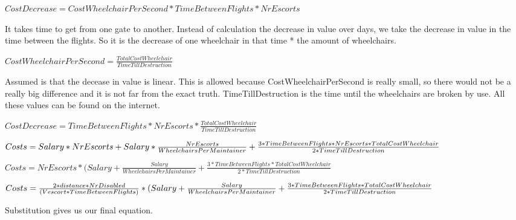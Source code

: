 \documentclass[a4paper, 11pt, notitlepage]{report}
\begin{document}
\begin{description}
	\item
	\item $CostDecrease  = CostWheelchairPerSecond * TimeBetweenFlights * NrEscorts$
	\item[Explanation:] It takes time to get from one gate to another. Instead of calculation the decrease in value over days, we take the decrease in value in the time between the flights. So it is the decrease of one wheelchair in that time * the amount of wheelchairs.
	\item $CostWheelchairPerSecond = \frac{TotalCostWheelchair}{TimeTillDestruction}$
	\item[Explanation:] Assumed is that the decease in value is linear. This is allowed because CostWheelchairPerSecond is really small, so there would not be a really big difference and it is not far from the exact truth. TimeTillDestruction is the time until the wheelchairs are broken by use. All these values can be found on the internet.
	\item $CostDecrease  = TimeBetweenFlights * NrEscorts * \frac{TotalCostWheelchair}{TimeTillDestruction}$
	\item
	\item $Costs = Salary * NrEscorts + Salary * \frac{NrEscorts}{WheelchairsPerMaintainer} \\ \\+ \frac{3* TimeBetweenFlights * NrEscorts * TotalCostWheelchair}{2*TimeTillDestruction}$
	\item $Costs = NrEscorts * (Salary + \frac{Salary}{WheelchairsPerMaintainer} + \frac{3* TimeBetweenFlights * TotalCostWheelchair}{2*TimeTillDestruction}$
	\item $Costs = \frac{2*distance*NrDisabled}{(Vescort*TimeBetweenFlights)} * \\ \\(Salary + \frac{Salary}{WheelchairsPerMaintainer} + \frac{3* TimeBetweenFlights * TotalCostWheelchair}{2*TimeTillDestruction}$
	\item[Explanation:] Substitution gives us our final equation.
	\item
\end{description}
\end{document}
